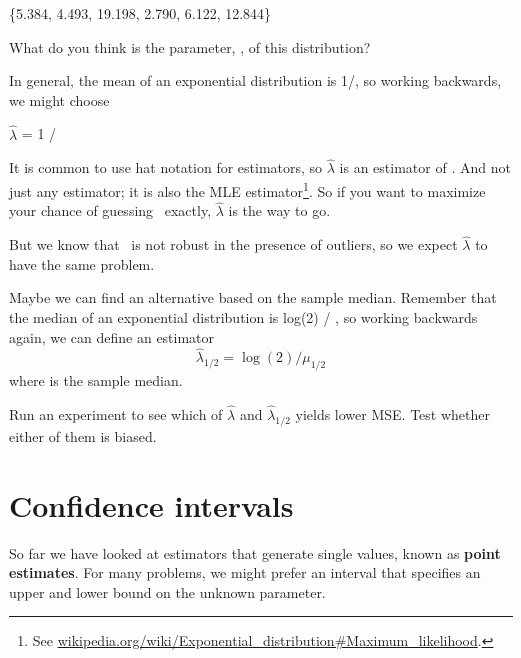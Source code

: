 \documentclass[12pt]{book}
\begin{document}
\{5.384, 4.493, 19.198, 2.790, 6.122, 12.844\}

What do you think is the parameter, \mylambda, of this distribution?

\newcommand{\lamhat}{\hat{\lambda}}
\newcommand{\lamhatmed}{\hat{\lambda}_{1/2}}

In general, the mean of an exponential distribution is 1/\mylambda,
so working backwards, we might choose

\quad $\lamhat$ = 1 / \myxbar

It is common to use hat notation for estimators, so $\lamhat$ is an
estimator of \mylambda.  And not just any estimator; it is also the
MLE estimator\footnote{See
\url{wikipedia.org/wiki/Exponential_distribution\#Maximum_likelihood}.}.
So if you want to maximize your chance of guessing \mylambda~exactly,
$\lamhat$ is the way to go.

But we know that \myxbar~is not robust in the presence of outliers, so
we expect $\lamhat$ to have the same problem.

Maybe we can find an alternative based on the sample median.  Remember
that the median of an exponential distribution is log(2) / \mylambda,
so working backwards again, we can define an estimator
%
\[ \lamhatmed = \log(2) / \mu_{1/2} \]
%
where \mymu {} is the sample median.

\begin{exercise}
Run an experiment to see which of $\lamhat$ and $\lamhatmed$ yields
lower MSE.  Test whether either of them is biased.


\end{exercise}


\section{Confidence intervals}

So far we have looked at estimators that generate single values, known
as {\bf point estimates}.  For many problems, we might prefer an interval
that specifies an upper and lower bound on the unknown parameter.
\end{document}
